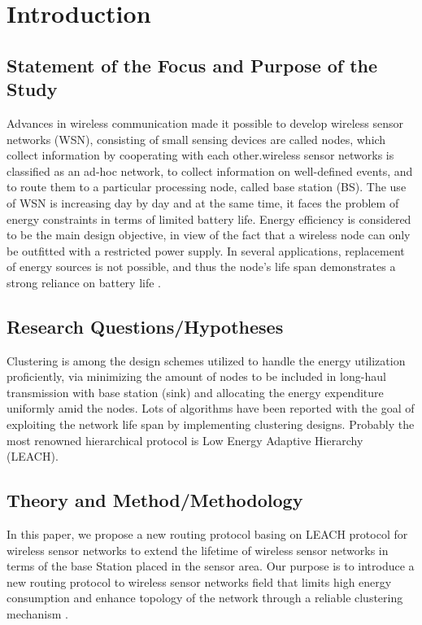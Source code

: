 \documentclass[paper=a4, fontsize=11pt]{scrartcl}
\numberwithin{equation}{section}		%
\numberwithin{figure}{section}			%
\numberwithin{table}{section}				%
\begin{document}
\section{Introduction}
\subsection{Statement of the Focus and Purpose of the Study}
Advances in wireless communication made it possible to develop wireless sensor networks (WSN), consisting of small sensing devices are called nodes, which collect information by cooperating with each other.wireless sensor networks is classified as an ad-hoc network, to collect information on well-defined events, and to route them to a particular processing node, called base station (BS). The use of WSN is increasing day by day and at the same time, it faces the problem of energy constraints in terms of limited battery life. \linebreak 
Energy efficiency is considered to be the main design objective, in view of the fact that a wireless node can only be outfitted with a restricted power supply.  In several applications, replacement of energy sources is not possible, and thus the node’s life span demonstrates a strong reliance on battery life .\linebreak 
\subsection{Research Questions/Hypotheses}
Clustering is among the design schemes utilized to handle the energy utilization proficiently, via minimizing the amount of nodes to be included in long-haul transmission with base station (sink) and allocating the energy expenditure uniformly amid the nodes. 
Lots of algorithms have been reported with the goal of exploiting the network life span by implementing clustering designs. Probably the most renowned  hierarchical protocol is Low Energy Adaptive Hierarchy (LEACH).\linebreak 
\subsection{Theory and Method/Methodology}
In this paper, we propose a new routing protocol basing on LEACH protocol for wireless sensor networks to extend the lifetime of wireless sensor networks in terms of the base Station placed in the sensor area.\linebreak 
Our purpose is to introduce a new routing protocol to wireless sensor networks field that limits high energy consumption and enhance topology of the network through a  reliable clustering mechanism .
\end{document}
